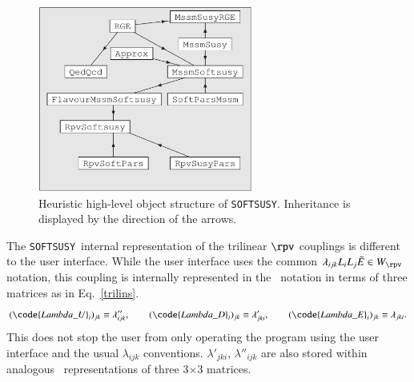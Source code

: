 \documentclass[final,3p,times,pdflatex]{elsarticle}
\def\SOFTSUSY{{\tt SOFTSUSY}}
\begin{document}
\begin{figure}
\begin{center}
\includegraphics[width=200pt]{rpvobj.eps}
\end{center}
\caption{Heuristic high-level object structure of \SOFTSUSY\@. Inheritance is
displayed by the direction of the arrows. \label{fig:objstruc}}
\end{figure}
The \SOFTSUSY~internal representation of the trilinear $\rpv$ couplings
is different to the user interface. While the user interface uses the
common $\lambda_{ijk} L_i L_j \bar E \in W_{\rpv}$ notation, this coupling is
internally represented in the \cite{Allanach:2003eb} ~notation in
terms of 
three matrices as in Eq.~\ref{trilins}. 
\begin{equation}
(\code{Lambda\_U}_i)_{jk}\equiv \lambda''_{ijk}, \qquad
(\code{Lambda\_D}_i)_{jk} \equiv \lambda'_{jki}, \qquad
(\code{Lambda\_E}_i)_{jk} \equiv \lambda_{jki}. \label{trilins}
\end{equation}
This does not stop
the user from only operating 
the program using the user interface and the usual $\lambda_{ijk}$ conventions.
$\lambda'_{jki}$, $\lambda''_{ijk}$ are also stored within analogous
~representations of three 3$\times$3 matrices. 
\end{document}
